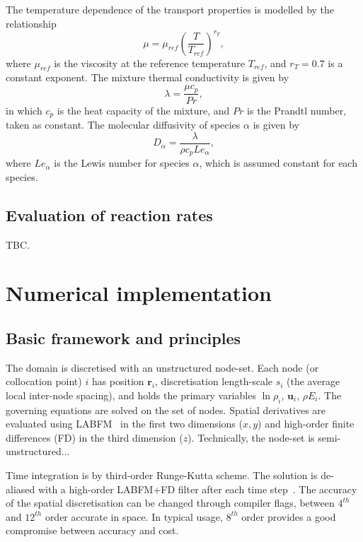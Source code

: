 \documentclass[notitlepage]{article}
\begin{document}
The temperature dependence of the transport properties is modelled by the relationship
\begin{equation}\mu=\mu_{ref}\left(\frac{T}{T_{ref}}\right)^{r_{T}},\label{eq:tdtp_mu}\end{equation}
where $\mu_{ref}$ is the viscosity at the reference temperature $T_{ref}$, and $r_{T}=0.7$ is a constant exponent. The mixture thermal conductivity is given by
\begin{equation}\lambda=\frac{\mu{c}_{p}}{Pr},\end{equation}
in which $c_{p}$ is the heat capacity of the mixture, and $Pr$ is the Prandtl number, taken as constant. The molecular diffusivity of species $\alpha$ is given by
\begin{equation}D_{\alpha}=\frac{\lambda}{\rho{c}_{p}Le_{\alpha}},\end{equation}
where $Le_{\alpha}$ is the Lewis number for species $\alpha$, which is assumed constant for each species.



\subsection{Evaluation of reaction rates}

TBC.


\section{Numerical implementation}

\subsection{Basic framework and principles}

The domain is discretised with an unstructured node-set. Each node (or collocation point) $i$ has position $\bm{r}_{i}$, discretisation length-scale $s_{i}$ (the average local inter-node spacing), and holds the primary variables $\ln\rho_{i}$, $\bm{u}_{i}$, $\rho{E}_{i}$. The governing equations are solved on the set of nodes. Spatial derivatives are evaluated using LABFM~\cite{king_labfm_2022} in the first two dimensions ($x,y$) and high-order finite differences (FD) in the third dimension ($z$). Technically, the node-set is semi-unstructured...

Time integration is by third-order Runge-Kutta scheme. The solution is de-aliased with a high-order LABFM+FD filter after each time step~\cite{king_labfm_2022}. The accuracy of the spatial discretisation can be changed through compiler flags, between $4^{th}$ and $12^{th}$ order accurate in space. In typical usage, $8^{th}$ order provides a good compromise between accuracy and cost.
\end{document}
